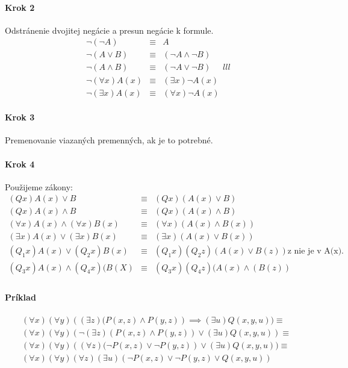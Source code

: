 \paragraph{Krok 2} Odstránenie dvojitej negácie a presun negácie k formule.
$$
\begin{array}{lll}
	\neg (\neg A) &\equiv& A \\
	\neg (A \lor B) &\equiv& (\neg A \land \neg B) \\
	\neg (A \land B) &\equiv& (\neg A \lor \neg B) \\
	\neg (\forall x) A(x) &\equiv& (\exists x) \neg A(x) \\
	\neg (\exists x) A(x) &\equiv& (\forall x) \neg A(x)
\end{array}{lll}
$$

\paragraph{Krok 3} Premenovanie viazaných premenných, ak je to potrebné.
\paragraph{Krok 4} Použijeme zákony:
$$
\begin{array}{lll}
	(Q x) A(x) \lor B &\equiv& (Q x)(A(x) \lor B) \\
	(Q x)A(x) \land B &\equiv& (Q x)(A(x) \land B) \\
	(\forall x) A(x) \land (\forall x)B(x) &\equiv& (\forall x)(A(x) \land
	B(x))\\
	(\exists x)A(x) \lor (\exists x)B(x) &\equiv& (\exists x) (A(x)\lor B(x))
	\\
	(Q_1 x) A(x) \lor (Q_2 x)B(x) &\equiv& (Q_1 x)(Q_2 z) (A(x)\lor B(z))
	\mbox{z nie je v A(x)}. \\
	(Q_3 x) A(x) \land (Q_4 x)(B(X) &\equiv& (Q_3 x)(Q_4 z)(A(x) \land (B(z))
	\\
\end{array}
$$

\paragraph{Príklad} $$
\begin{array}{l}
(\forall x)(\forall y) \left( (\exists z)(P(x,z) \land
P(y,z)\right) \implies (\exists u) Q(x,y,u)) \equiv \\
(\forall x)(\forall
y)\left(\neg (\exists z)(P(x,z)\land P(y,z))\lor(\exists u)Q(x,y,u)\right)
\equiv \\
(\forall x)(\forall y)\left((\forall z)(\neg P(x,z)\lor \neg
P(y,z)\right)\lor(\exists u)Q(x,y,u)) \equiv \\
(\forall x)(\forall y)(\forall z)(\exists u)(\neg P(x,z) \lor \neg
P(y,z) \lor Q(x,y,u)) \\
\end{array}
$$

